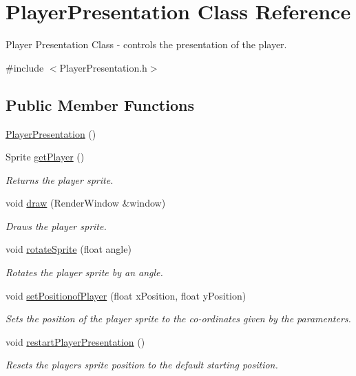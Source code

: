 \hypertarget{class_player_presentation}{}\section{Player\+Presentation Class Reference}
\label{class_player_presentation}


Player Presentation Class -\/ controls the presentation of the player.  




{\ttfamily \#include $<$Player\+Presentation.\+h$>$}

\subsection*{Public Member Functions}
\begin{DoxyCompactItemize}
\item 
\hyperlink{class_player_presentation_ae5b2e1e54cb57697d020eb1afe45225f}{Player\+Presentation} ()
\item 
Sprite \hyperlink{class_player_presentation_a5ce015d2ac13d9e3eacf89b96da31ee2}{get\+Player} ()
\begin{DoxyCompactList}\small\item\em Returns the player sprite. \end{DoxyCompactList}\item 
void \hyperlink{class_player_presentation_a0ee08eeb4f0c8687450f60d635b4fe8a}{draw} (Render\+Window \&window)
\begin{DoxyCompactList}\small\item\em Draws the player sprite. \end{DoxyCompactList}\item 
void \hyperlink{class_player_presentation_af938e83bf3a90263076411e0935731bd}{rotate\+Sprite} (float angle)
\begin{DoxyCompactList}\small\item\em Rotates the player sprite by an angle. \end{DoxyCompactList}\item 
void \hyperlink{class_player_presentation_aef6ba74848a34fb93528062bda98059e}{set\+Positionof\+Player} (float x\+Position, float y\+Position)
\begin{DoxyCompactList}\small\item\em Sets the position of the player sprite to the co-\/ordinates given by the paramenters. \end{DoxyCompactList}\item 
void \hyperlink{class_player_presentation_ae4bf63751b63f582902d4ea31e06a486}{restart\+Player\+Presentation} ()
\begin{DoxyCompactList}\small\item\em Resets the player\textquotesingle{}s sprite position to the default starting position. \end{DoxyCompactList}\end{DoxyCompactItemize}


